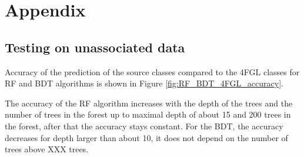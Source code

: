 \section{Appendix}

\subsection{Testing on unassociated data}


Accuracy of the prediction of the source classes compared to the 4FGL classes for RF and BDT algorithms is shown in Figure \ref{fig:RF_BDT_4FGL_accuracy}.



The accuracy of the RF algorithm increases with the depth of the trees and the number of trees in the forest
up to maximal depth of about 15 and 200 trees in the forest, after that the accuracy stays constant.
For the BDT, the accuracy decreases for depth larger than about 10, it does not depend on the number of trees above XXX trees.


